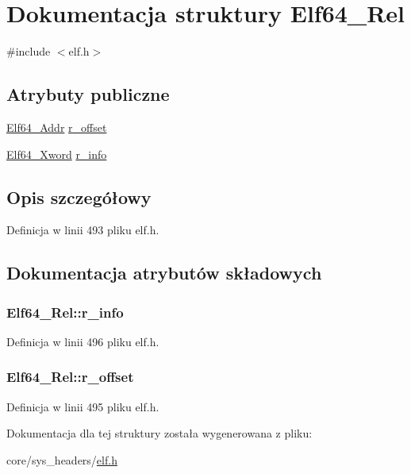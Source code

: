 \hypertarget{struct_elf64___rel}{\section{Dokumentacja struktury Elf64\-\_\-\-Rel}
\label{struct_elf64___rel}
}


{\ttfamily \#include $<$elf.\-h$>$}

\subsection*{Atrybuty publiczne}
\begin{DoxyCompactItemize}
\item 
\hyperlink{elf_8h_aeed51d08e3a950d637f8ec1f0cd4ef65}{Elf64\-\_\-\-Addr} \hyperlink{struct_elf64___rel_af719169bd59569a885bf9d5df794b951}{r\-\_\-offset}
\item 
\hyperlink{elf_8h_a5447a48a3dae0bd24f606415268c6fe4}{Elf64\-\_\-\-Xword} \hyperlink{struct_elf64___rel_a775740962c9bd1e3f956bd8bffca173b}{r\-\_\-info}
\end{DoxyCompactItemize}


\subsection{Opis szczegółowy}


Definicja w linii 493 pliku elf.\-h.



\subsection{Dokumentacja atrybutów składowych}
\hypertarget{struct_elf64___rel_a775740962c9bd1e3f956bd8bffca173b}{
\subsubsection[{r\-\_\-info}]{ Elf64\-\_\-\-Rel\-::r\-\_\-info}}\label{struct_elf64___rel_a775740962c9bd1e3f956bd8bffca173b}


Definicja w linii 496 pliku elf.\-h.

\hypertarget{struct_elf64___rel_af719169bd59569a885bf9d5df794b951}{
\subsubsection[{r\-\_\-offset}]{ Elf64\-\_\-\-Rel\-::r\-\_\-offset}}\label{struct_elf64___rel_af719169bd59569a885bf9d5df794b951}


Definicja w linii 495 pliku elf.\-h.



Dokumentacja dla tej struktury została wygenerowana z pliku\-:\begin{DoxyCompactItemize}
\item 
core/sys\-\_\-headers/\hyperlink{elf_8h}{elf.\-h}\end{DoxyCompactItemize}
